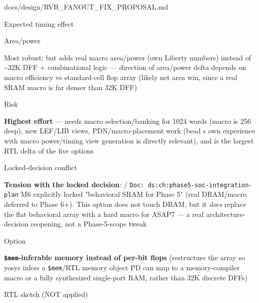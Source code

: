 \begin{relocated}{docs/design/RVB_FANOUT_FIX_PROPOSAL.md}
\begin{rowtable}
\begin{rowcell}{Expected timing effect}
\end{rowcell}

\begin{rowcell}{Area/\allowbreak{}power}

Most robust; but adds real macro area/\allowbreak{}power (own Liberty
numbers) instead of \textasciitilde32K DFF + combinational logic ---
direction of area/\allowbreak{}power delta depends on macro efficiency
vs standard-cell flop array (likely net area win, since a real SRAM
macro is far denser than 32K DFF)

\end{rowcell}

\begin{rowcell}{Risk}

\textbf{Highest effort} --- needs macro selection/\allowbreak{}banking
for 1024 words (macro is 256 deep), new LEF/LIB views,
PDN/\allowbreak{}macro-placement work (bead \textquotesingle s
own experience with macro power/\allowbreak{}timing view generation is
directly relevant), and is the largest RTL delta of the five options

\end{rowcell}

\begin{rowcell}{Locked-decision conflict}

\textbf{Tension with the locked decision}:  /
\texttt{Doc:\allowbreak{}\ ds:\allowbreak{}ch:\allowbreak{}phase5-\allowbreak{}soc-\allowbreak{}integration-\allowbreak{}plan}
M6 explicitly locked "behavioral SRAM for Phase 5" (real
DRAM/\allowbreak{}macro deferred to Phase 6+). This option does not
touch DRAM, but it \emph{does} replace the flat behavioral array with a
hard macro for ASAP7 --- a real architecture-decision reopening, not a
Phase-5-scope tweak

\end{rowcell}


\begin{rowcell}{Option}

\textbf{\texttt{\$mem}-inferable memory instead of per-bit flops}
(restructure the array so yosys infers a \texttt{\$mem}/RTL memory
object PD can map to a memory-compiler macro or a fully synthesized
single-port RAM, rather than 32K discrete DFFs)

\end{rowcell}

\begin{rowcell}{RTL sketch (NOT applied)}


\end{rowcell}
\end{rowtable}
\end{relocated}
